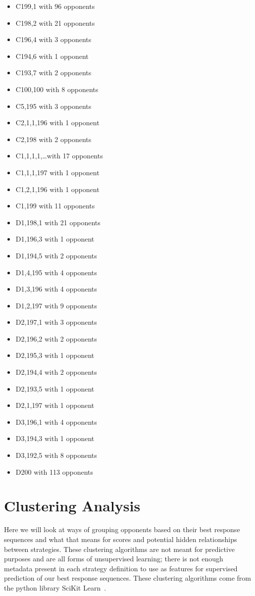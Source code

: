 \begin{multicols}{3}
    \begin{itemize}
        \item  C199,1 with 96 opponents
	    \item  C198,2 with 21 opponents
	    \item  C196,4 with 3 opponents
	    \item  C194,6 with 1 opponent
	    \item  C193,7 with 2 opponents
	    \item  C100,100 with 8 opponents
	    \item  C5,195 with 3 opponents
	    \item  C2,1,1,196 with 1 opponent
	    \item  C2,198 with 2 opponents
	    \item  C1,1,1,1,\ldots with 17 opponents
	    \item  C1,1,1,197 with 1 opponent
	    \item  C1,2,1,196 with 1 opponent
	    \item  C1,199 with 11 opponents
	    \item  D1,198,1 with 21 opponents
	    \item  D1,196,3 with 1 opponent
	    \item  D1,194,5 with 2 opponents
	    \item  D1,4,195 with 4 opponents
	    \item  D1,3,196 with 4 opponents
	    \item  D1,2,197 with 9 opponents
	    \item  D2,197,1 with 3 opponents
	    \item  D2,196,2 with 2 opponents
	    \item  D2,195,3 with 1 opponent
	    \item  D2,194,4 with 2 opponents
	    \item  D2,193,5 with 1 opponent
	    \item  D2,1,197 with 1 opponent
	    \item  D3,196,1 with 4 opponents
	    \item  D3,194,3 with 1 opponent
	    \item  D3,192,5 with 8 opponents
	    \item  D200 with 113 opponents
    \end{itemize}
\end{multicols}
\section{Clustering Analysis}
Here we will look at ways of grouping opponents based on their best response sequences and what that means for scores and potential hidden relationships between strategies.
These clustering algorithms are not meant for predictive purposes and are all forms of unsupervised learning; there is not enough metadata present in each strategy definition to use as features for supervised prediction of our best response sequences.
These clustering algorithms come from the python library SciKit Learn~\cite{pedregosa2011scikit}.

